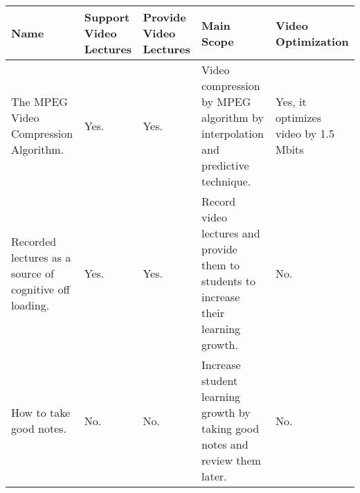 \begin{sideways}
\centering
\begin{tabularx}{1.5\textwidth} { 
  | >{\raggedright\arraybackslash}X 
  | >{\centering\arraybackslash}X | >{\centering\arraybackslash}X | >{\centering\arraybackslash}X | >{\raggedleft\arraybackslash}X | }
 \hline
\bfseries{Name} & \bfseries{Support Video Lectures} &\bfseries{Provide Video Lectures} &\bfseries{Main Scope} & \bfseries{Video Optimization}  \\
\hline
The MPEG Video Compression Algorithm.\cite{LeGall1992}
& Yes.
& Yes.
& Video compression by MPEG algorithm by interpolation and predictive technique.  
& Yes, it optimizes video by 1.5 Mbits
\\
\hline

Recorded lectures as a source of cognitive off loading.\cite{Patel2019}
& Yes.
& Yes.
& Record video lectures and provide them to students to increase their learning growth.
& No.
\\

\hline
How to take good notes.\cite{Kiewra2018}
& No.
& No.
& Increase student learning growth by taking good notes and review them later.
& No.
\\
\hline


\end{tabularx}
\end{sideways}


